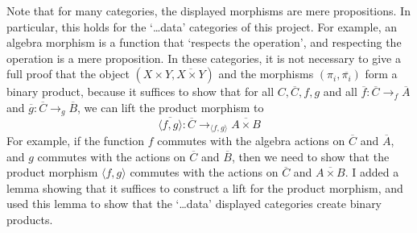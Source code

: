 Note that for many categories, the displayed morphisms are mere propositions. In particular, this holds for the `\dots data' categories of this project. For example, an algebra morphism is a function that `respects the operation', and respecting the operation is a mere proposition. In these categories, it is not necessary to give a full proof that the object $ (X \times Y, \overline{X \times Y}) $ and the morphisms $ (\pi_i, \overline{\pi_i}) $ form a binary product, because it suffices to show that for all $ C, \overline C, f, g $ and all $ \overline f : \overline C \to_f \overline A $ and $ \overline g : \overline C \to_g \overline B $, we can lift the product morphism to
\[ \overline{\langle f, g \rangle} : \overline C \to_{\langle f, g \rangle} \overline{A \times B} \]
For example, if the function $ f $ commutes with the algebra actions on $ \overline C $ and $ \overline A $, and $ g $ commutes with the actions on $ \overline C $ and $ \overline B $, then we need to show that the product morphism $ \langle f, g \rangle $ commutes with the actions on $ \overline C $ and $ \overline{A \times B} $. I added a lemma showing that it suffices to construct a lift for the product morphism, and used this lemma to show that the `\dots data' displayed categories create binary products.

